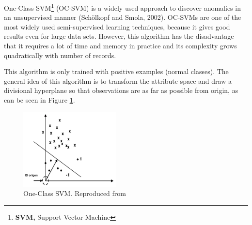 One-Class SVM\footnote{\textbf{SVM, }Support Vector Machine} (OC-SVM) is a widely used approach to discover anomalies in an unsupervised manner (Schölkopf and Smola, 2002). OC-SVMs are one of the most widely used semi-supervised learning techniques, because it gives good results even for large data sets. However, this algorithm has the disadvantage that it requires a lot of time and memory in practice and its complexity grows quadratically with number of records.

\vspace{5mm} %

This algorithm is only trained with positive examples (normal classes). The general idea of this algorithm is to transform the attribute space and draw a divisional hyperplane so that observations are as far as possible from origin, as can be seen in Figure \ref{fig:oc-svm}.

\begin{figure}[h!]
  \begin{center}	\includegraphics[width=0.45\textwidth, frame]{imagenes/Cap4/oc-svm}
  \caption{One-Class SVM. Reproduced from \protect\cite{Reference72}} 
  \label{fig:oc-svm}
  \end{center}
\end{figure}

